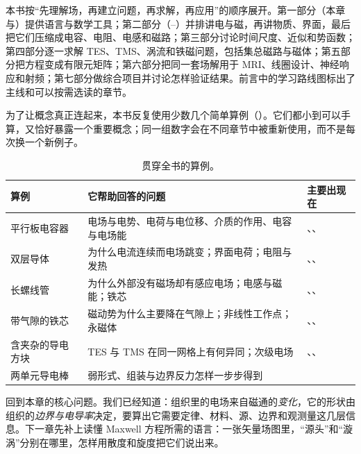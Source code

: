 本书按“先理解场，再建立问题，再求解，再应用”的顺序展开。第一部分（本章与）提供语言与数学工具；第二部分（--）并排讲电与磁，再讲物质、界面，最后把它们压缩成电容、电阻、电感和磁路；第三部分讨论时间尺度、近似和势函数；第四部分逐一求解 TES、TMS、涡流和铁磁问题，包括集总磁路与磁体；第五部分把方程变成有限元矩阵；第六部分把同一套场解用于 MRI、线圈设计、神经响应和射频；第七部分做综合项目并讨论怎样验证结果。前言中的学习路线图标出了主线和可以按需选读的章节。

为了让概念真正连起来，本书反复使用少数几个简单算例（）。它们都小到可以手算，又恰好暴露一个重要概念；同一组数字会在不同章节中被重新使用，而不是每次换一个新例子。

\begin{table}[H]\centering\small
\caption{贯穿全书的算例。}\label{tab:intro-examples}
\begin{tabularx}{\linewidth}{@{}l Y l@{}}
\toprule
算例 & 它帮助回答的问题 & 主要出现在\\\midrule
平行板电容器 & 电场与电势、电荷与电位移、介质的作用、电容与电场能 & 、、\\
双层导体 & 为什么电流连续而电场跳变；界面电荷；电阻与发热 & 、、\\
长螺线管 & 为什么外部没有磁场却有感应电场；电感与磁能；铁芯 & 、、\\
带气隙的铁芯 & 磁动势为什么主要降在气隙上；非线性工作点；永磁体 & 、、\\
含夹杂的导电方块 & TES 与 TMS 在同一网格上有何异同；次级电场 & 、、\\
两单元导电棒 & 弱形式、组装与边界反力怎样一步步得到 & \\
\bottomrule
\end{tabularx}
\end{table}

回到本章的核心问题。我们已经知道：组织里的电场来自磁通的\emph{变化}，它的形状由组织的\emph{边界与电导率}决定，要算出它需要定律、材料、源、边界和观测量这几层信息。下一章先补上读懂 Maxwell 方程所需的语言：一张矢量场图里，“源头”和“漩涡”分别在哪里，怎样用散度和旋度把它们说出来。

